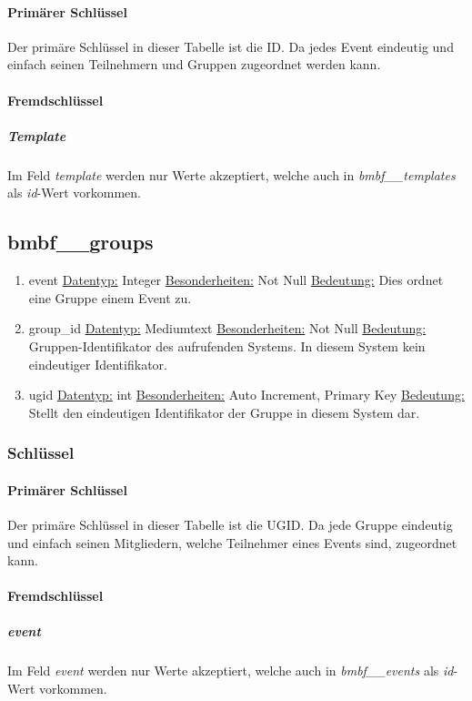 \documentclass[12pt,parskip=full, pagea4]{scrreprt}
\begin{document}
				\paragraph{Prim\"arer Schl\"ussel}Der prim\"are Schl\"ussel in dieser Tabelle ist die ID. Da jedes Event eindeutig und einfach seinen Teilnehmern und Gruppen zugeordnet werden kann.
				\paragraph{Fremdschl\"ussel}
					\subparagraph{Template} \leftskip=1.5cm Im Feld \textit{template} werden nur Werte akzeptiert, welche auch in \textit{bmbf\_\_templates} als \textit{id}-Wert vorkommen.
			\subsection{bmbf\_\_groups}
			\begin{enumerate}
				\item event
				\subitem \underline{Datentyp:} Integer
				\subitem \underline{Besonderheiten:} Not Null
				\subitem \underline{Bedeutung:} Dies ordnet eine Gruppe einem Event zu.
				\item group\_id
				\subitem \underline{Datentyp:} Mediumtext
				\subitem \underline{Besonderheiten:} Not Null
				\subitem \underline{Bedeutung:} Gruppen-Identifikator des aufrufenden Systems. In diesem System kein eindeutiger Identifikator.
				\item ugid
				\subitem \underline{Datentyp:} int
				\subitem \underline{Besonderheiten:} Auto Increment, Primary Key
				\subitem \underline{Bedeutung:} Stellt den eindeutigen Identifikator der Gruppe in diesem System dar.
			\end{enumerate}
			\subsubsection{Schl\"ussel}
			\leftskip=0cm
			\paragraph{Prim\"arer Schl\"ussel}Der prim\"are Schl\"ussel in dieser Tabelle ist die UGID. Da jede Gruppe eindeutig und einfach seinen Mitgliedern, welche Teilnehmer eines Events sind, zugeordnet kann.
			\paragraph{Fremdschl\"ussel}
			\subparagraph{event} \leftskip=1.5cm Im Feld \textit{event} werden nur Werte akzeptiert, welche auch in \textit{bmbf\_\_events} als \textit{id}-Wert vorkommen.
\end{document}
